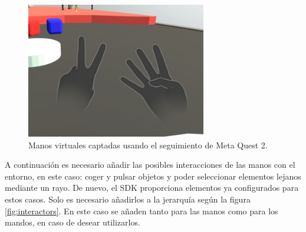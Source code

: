 \begin{figure}
	\centering
	\includegraphics[width=0.7\textwidth]{04.Desarrollo/05.Entrega5/01.Iteracion5_1/00.Figuras/05.hand_tracking.png}
	\caption{Manos virtuales captadas usando el seguimiento de Meta Quest 2.}
	\label{fig:hand_tracking}
\end{figure}

A continuación es necesario añadir las posibles interacciones de las manos con el entorno, en este caso: coger y pulsar objetos y poder seleccionar elementos lejanos mediante un rayo. De nuevo, el SDK proporciona elementos ya configurados para estos casos. Solo es necesario añadirlos a la jerarquía según la figura \ref{fig:interactors}. En este caso se añaden tanto para las manos como para los mandos, en caso de desear utilizarlos.


